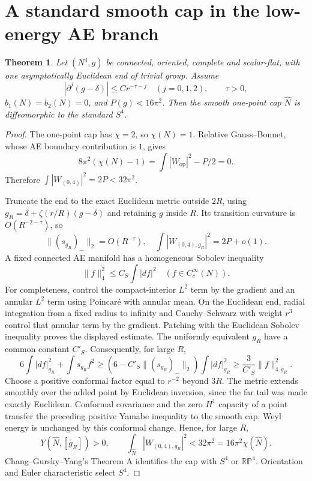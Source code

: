 \documentclass[11pt,a4paper]{article}
\newtheorem{theorem}{Theorem}[section]
\theoremstyle{remark}\newtheorem{remark}[theorem]{Remark}
\begin{document}
\section{A standard smooth cap in the low-energy AE branch}
\begin{theorem}\label{thm:cap}
Let $(N^4,g)$ be connected, oriented, complete and scalar-flat, with one asymptotically Euclidean end of trivial group. Assume
\[
 |\partial^j(g-\delta)|\le Cr^{-\tau-j}\quad(j=0,1,2),\qquad\tau>0,
\]
$b_1(N)=b_2(N)=0$, and $P(g)<16\pi^2$. Then the smooth one-point cap $\widehat N$ is diffeomorphic to the standard $S^4$.
\end{theorem}
\begin{proof}
The one-point cap has $\chi=2$, so $\chi(N)=1$. Relative Gauss--Bonnet, whose AE boundary contribution is $1$, gives
\[
 8\pi^2(\chi(N)-1)=\int|W_{\mathrm{op}}|^2-P/2=0.
\]
Therefore $\int|W_{(0,4)}|^2=2P<32\pi^2$.

Truncate the end to the exact Euclidean metric outside $2R$, using
$g_R=\delta+\zeta(r/R)(g-\delta)$ and retaining $g$ inside $R$.
Its transition curvature is $O(R^{-2-\tau})$, so
\[
 \|(s_{g_R})_-\|_2=O(R^{-\tau}),\quad
 \int|W_{(0,4),g_R}|^2=2P+o(1).
\]
A fixed connected AE manifold has a homogeneous Sobolev inequality
\[
 \|f\|_4^2\le C_S\int|df|^2\quad(f\in C_c^\infty(N)).
\]
For completeness, control the compact-interior $L^2$ term by the gradient and an annular $L^2$ term using Poincar\'e with annular mean. On the Euclidean end, radial integration from a fixed radius to infinity and Cauchy--Schwarz with weight $r^3$ control that annular term by the gradient. Patching with the Euclidean Sobolev inequality proves the displayed estimate. The uniformly equivalent $g_R$ have a common constant $C'_S$.
Consequently, for large $R$,
\[
 6\int|df|_{g_R}^2+\int s_{g_R}f^2
 \ge(6-C'_S\|(s_{g_R})_-\|_2)\int|df|_{g_R}^2
 \ge\frac3{C'_S}\|f\|_{4,g_R}^2.
\]
Choose a positive conformal factor equal to $r^{-2}$ beyond $3R$.
The metric extends smoothly over the added point by Euclidean inversion, since the far tail was made exactly Euclidean. Conformal covariance and the zero $H^1$ capacity of a point transfer the preceding positive Yamabe inequality to the smooth cap. Weyl energy is unchanged by this conformal change. Hence, for large $R$,
\[
 Y(\widehat N,[\bar g_R])>0,\qquad
 \int_{\widehat N}|W_{(0,4),\bar g_R}|^2<32\pi^2
 =16\pi^2\chi(\widehat N).
\]
Chang--Gursky--Yang's Theorem A \cite{CGY} identifies the cap with $S^4$ or $\mathbb{RP}^4$. Orientation and Euler characteristic select $S^4$.
\end{proof}
\end{document}
